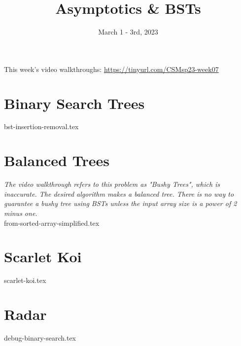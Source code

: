 \documentclass[11pt]{exam}
\title{Asymptotics \& BSTs}
\date{March 1 - 3rd, 2023}
\begin{document}
\maketitle
This week's video walkthroughs:
\href{https://tinyurl.com/CSMsp23-week07}{https://tinyurl.com/CSMsp23-week07}


\section{Binary Search Trees}
\begin{questions}
{bst-insertion-removal.tex}
\end{questions}

\pagebreak

\section{Balanced Trees}
\begin{questions}
\textit{The video walkthrough refers to this problem as "Bushy Trees", which is inaccurate. The desired algorithm makes a balanced tree. There is no way to guarantee a bushy tree using BSTs unless the input array size is a power of 2 minus one.}\\
{from-sorted-array-simplified.tex}
\end{questions}


\pagebreak
\section{Scarlet Koi}
\begin{questions}
{scarlet-koi.tex}
\end{questions}


\pagebreak
\section{Radar}
\begin{questions}
{debug-binary-search.tex}
\end{questions} 
\end{document}

